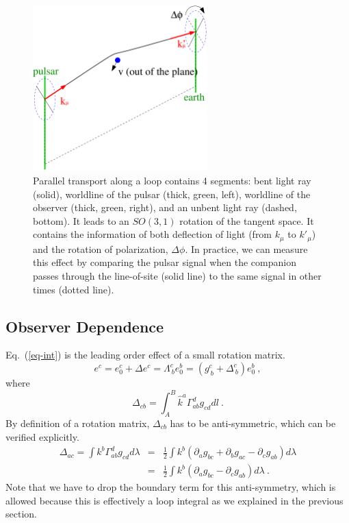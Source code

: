 \documentclass[aps,showpacs,onecolumn,floats,prd,superscriptaddress,nofootinbib]{revtex4}
\begin{document}
\begin{figure}
\includegraphics[width=0.6\textwidth]{loop.pdf}
\caption{\label{fig:loop}
Parallel transport along a loop contains 4 segments: bent light ray (solid), worldline of the pulsar (thick, green, left), worldline of the observer (thick, green, right), and an unbent light ray (dashed, bottom). It leads to an $SO(3,1)$ rotation of the tangent space. It contains the information of both deflection of light (from $k_\mu$ to $k'_\mu$) and the rotation of polarization, $\Delta\phi$. In practice, we can measure this effect by comparing the pulsar signal when the companion passes through the line-of-site (solid line) to the same signal in other times (dotted line).}
\end{figure}

\subsection{Observer Dependence}

Eq.~(\ref{eq-int}) is the leading order effect of a small rotation matrix.
\begin{equation}
e^c = e_0^c + \Delta e^c = \Lambda^c_{\ b} e_0^b = 
\left( g^c_{\ b} + \Delta^c_{\ b} \right) e_0^b~,
\end{equation}
where
\begin{equation}
\Delta_{cb} = \int_A^B \hat{k}^a \Gamma^d_{ab} g_{cd}dl~.
\end{equation}
By definition of a rotation matrix, $\Delta_{cb}$ has to be anti-symmetric, which can be verified explicitly.
\begin{eqnarray}
\Delta_{ac} = \int k^b\Gamma_{ab}^d g_{cd}d\lambda &=& 
\frac{1}{2} \int k^b \left(\partial_a g_{bc} + \partial_bg_{ac} - \partial_c g_{ab}\right)d\lambda
\label{eq-Delta}
\\ \nonumber
&=& \frac{1}{2} \int k^b \left(\partial_a g_{bc} - \partial_c g_{ab}\right)d\lambda~.
\end{eqnarray}
Note that we have to drop the boundary term for this anti-symmetry, which is allowed because this is effectively a loop integral as we explained in the previous section.
\end{document}

